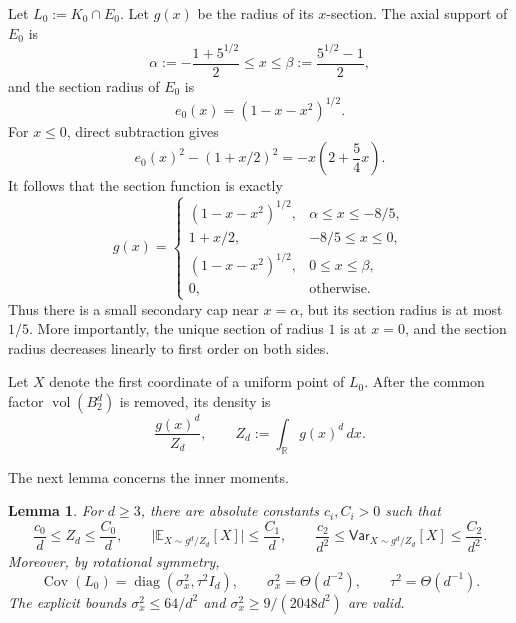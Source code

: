 \documentclass[11pt]{article}
\numberwithin{equation}{section}
\newtheorem{lemma}{Lemma}[section]
\theoremstyle{definition}
\newcommand{\E}[2]{\mathbb{E}_{#1}\left[#2\right]}
\newcommand{\V}[2]{\mathsf{Var}_{#1}\left[#2\right]}
\begin{document}
Let $L_0:=K_0\cap E_0$.
Let $g(x)$ be the radius of its
$x$-section.
The axial support of $E_0$ is
\[
\alpha
:=-\frac{1+5^{1/2}}{2}
\leq x
\leq \beta
:=\frac{5^{1/2}-1}{2},
\]
and the section radius of $E_0$ is
\[
  e_0(x)=(1-x-x^2)^{1/2}.
\]
For $x\leq 0$, direct subtraction gives
\begin{equation}
\label{app:counterexample:eq:radius-difference}
  e_0(x)^2-(1+x/2)^2=-x\left(2+\frac54x\right).
\end{equation}
It follows that the section function is exactly
\begin{equation}
\label{app:counterexample:eq:section-function}
  g(x)=
  \begin{cases}
    (1-x-x^2)^{1/2}, & \alpha\leq x\leq-8/5,\\
    1+x/2,          & -8/5\leq x\leq 0,\\
    (1-x-x^2)^{1/2}, & 0\leq x\leq\beta,\\
    0,              & \text{otherwise}.
  \end{cases}
\end{equation}
Thus there is a small secondary cap near $x=\alpha$, but its section radius is
at most
$1/5$.
More importantly, the unique section of radius $1$ is at
$x=0$, and the section radius decreases linearly to first order on both sides.

Let $X$ denote the first coordinate of a uniform point of
$L_0$.
After the common factor $\operatorname{vol}(B_2^d)$ is removed, its density is
\begin{equation}
\label{app:counterexample:eq:density}
  \frac{g(x)^d}{Z_d}, \qquad
  Z_d:=\int_{\mathbb{R}}g(x)^d\,dx.
\end{equation}

The next lemma concerns the inner moments.

\begin{lemma}
\label{app:counterexample:lemma:inner-moments}
For $d\geq 3$, there are absolute constants
$c_i,C_i>0$ such that
\[
\frac{c_0}{d}
\leq Z_d
\leq\frac{C_0}{d},
\qquad
\lvert\E{X\sim g^d/Z_d}{X}\rvert\leq\frac{C_1}{d},
\qquad
\frac{c_2}{d^2}
\leq\V{X\sim g^d/Z_d}{X}
\leq\frac{C_2}{d^2}.
\]
Moreover, by rotational symmetry,
\[
\operatorname{Cov}(L_0)=\operatorname{diag}(\sigma_x^2,\tau^2 I_d),
\qquad
\sigma_x^2=\Theta(d^{-2}),
\qquad
\tau^2=\Theta(d^{-1}).
\]
The explicit bounds $\sigma_x^2\leq 64/d^2$ and
$\sigma_x^2\geq 9/(2048d^2)$ are valid.
\end{lemma}
\end{document}

